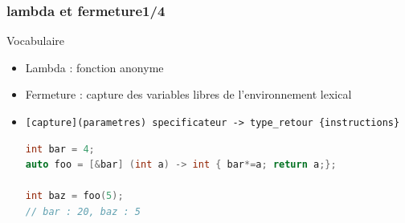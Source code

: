 \documentclass[C++.tex]{subfiles}
\begin{document}
\begin{frame}[fragile]
	\frametitle{lambda et fermeture\titlehfill{}1/4}
	\begin{block}{Vocabulaire}
		\begin{itemize}
			\item Lambda : fonction anonyme
			\item Fermeture : capture des variables libres de l'environnement lexical
		\end{itemize}
	\end{block}

	\pause

	\begin{itemize}
		\item \lstinline|[capture](parametres) specificateur -> type_retour {instructions}|

		\begin{lstlisting}[language=C++]
int bar = 4;
auto foo = [&bar] (int a) -> int { bar*=a; return a;};

int baz = foo(5);
// bar : 20, baz : 5\end{lstlisting}
	\end{itemize}
\end{frame}
\end{document}
